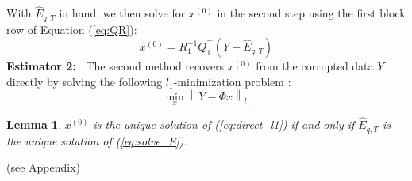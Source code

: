\documentclass[twocolumn]{autart}    %
\newcommand{\norm}[1]{\left\lVert#1\right\rVert}
\newtheorem{Lem}{\bf{Lemma}}
\newcommand{\rev}[1]{{\normalsize{{{\color{blue}#1}}}}}
\begin{document}
With $\hat E_{q,T}$ in hand, we then solve for $x^{(0)}$ in the second step using the first block row of Equation (\ref{eq:QR}):
\begin{equation}
	x^{(0)} = R_1^{-1} Q_1^\top (Y- \hat E_{q,T})
	\label{eq:QR1}
\end{equation}
{\bf \rev{Estimator} 2:~} 
The second method recovers $x^{(0)}$ from the corrupted data $Y$ directly by %
solving the following $l_1$-minimization problem \cite{Candes_Tao}:
\begin{equation}
	\min_x \norm { Y  - \Phi x}_{l_1}
	\label{eq:direct_l1}
\end{equation}
\vspace{-0.6cm}
\begin{Lem} \label{lem:equivalent}
 $x^{(0)}$ is the unique solution of (\ref{eq:direct_l1}) if and only if ${\hat E}_{q,T}$ is the unique solution of (\ref{eq:solve_E}).
\end{Lem}
\vspace{-0.6cm}
\begin{pf} \rev{(see Appendix)}
\end{pf}
\vspace{-0.4cm}
\end{document}

